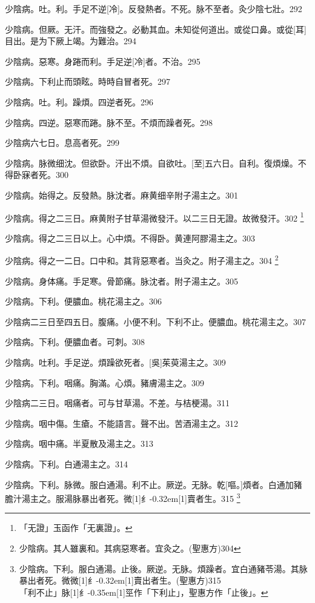 \documentclass[11pt,oneside,b5paper]{ctexbook}
\begin{document}
\begin{flushleft}
少陰病。吐。利。手足不逆[冷]。反發熱者。不死。脉不至者。灸少陰七壯。292

少陰病。但厥。无汗。而強發之。必動其血。未知從何道出。或從口鼻。或從[耳]目出。是为下厥上竭。为難治。294

少陰病。惡寒。身踡而利。手足逆[冷]者。不治。295

少陰病。下利止而頭眩。時時自冒者死。297

少陰病。吐。利。躁煩。四逆者死。296

少陰病。四逆。惡寒而踡。脉不至。不煩而躁者死。298

少陰病六七日。息高者死。299

少陰病。脉微细沈。但欲卧。汗出不煩。自欲吐。[至]五六日。自利。復煩燥。不得卧寐者死。300

少陰病。始得之。反發熱。脉沈者。麻黄细辛附子湯主之。301

少陰病。得之二三日。麻黄附子甘草湯微發汗。以二三日无證。故微發汗。302
\footnote{「无證」玉函作「无裏證」。}

少陰病。得之二三日以上。心中煩。不得卧。黄連阿膠湯主之。303

少陰病。得之一二日。口中和。其背惡寒者。当灸之。附子湯主之。304
\footnote{少陰病。其人雖裏和。其病惡寒者。宜灸之。(聖惠方)304}

少陰病。身体痛。手足寒。骨節痛。脉沈者。附子湯主之。305

少陰病。下利。便膿血。桃花湯主之。306

少陰病二三日至四五日。腹痛。小便不利。下利不止。便膿血。桃花湯主之。307

少陰病。下利。便膿血者。可刺。308

少陰病。吐利。手足逆。煩躁欲死者。[吳]茱萸湯主之。309

少陰病。下利。咽痛。胸滿。心煩。豬膚湯主之。309

少陰病二三日。咽痛者。可与甘草湯。不差。与桔梗湯。311

少陰病。咽中傷。生瘡。不能語言。聲不出。苦酒湯主之。312

少陰病。咽中痛。半夏散及湯主之。313

少陰病。下利。白通湯主之。314

少陰病。下利。脉微。服白通湯。利不止。厥逆。无脉。乾[嘔。]煩者。白通加豬膽汁湯主之。服湯脉暴出者死。微{\hbox{\scalebox{0.6}[1]{纟}\kern-0.32em\scalebox{0.7}[1]{賣}}}者生。315
\footnote{少陰病。下利。服白通湯。止後。厥逆。无脉。煩躁者。宜白通豬苓湯。其脉暴出者死。微微{\hbox{\scalebox{0.6}[1]{纟}\kern-0.32em\scalebox{0.7}[1]{賣}}}出者生。(聖惠方)315\\「利不止」脉{\hbox{\scalebox{0.68}[1]{纟}\kern-0.35em\scalebox{0.64}[1]{巠}}}作「下利止」，聖惠方作「止後」。}


\end{flushleft}
\end{document}

